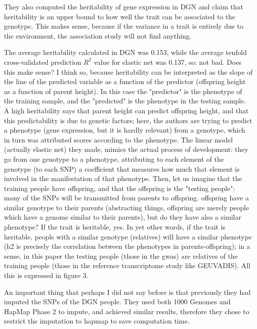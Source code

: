 \documentclass[../main.tex]{subfiles}
\begin{document}

They also computed the heritability of gene expression in DGN and claim 
that heritability is an upper bound to how well the trait can be 
associated to the genotype. This makes sense, because if the variance in 
a trait is entirely due to the environment, the association study will 
not find anything.

The average heritability calculated in DGN was 0.153, while the average 
tenfold cross-validated prediction $R^2$ value for elastic net was 
0.137, so: not bad. Does this make sense? I think so, because 
  heritability can be interpreted as the slope of the line of the 
predicted variable as a function of the predictor (\eg offspring height 
as a function of parent height). In this case the "predictor" is the 
phenotype of the training sample, and the "predicted" is the phenotype 
in the testing sample. A high heritability says that parent height can 
predict offspring height, and that this predictability is due to genetic 
factors; here, the authors are trying to predict a phenotype (gene 
expression, but it is hardly relevant) from a genotype, which in turn 
was attributed scores according to the phenotype. The linear model 
(actually elastic net) they made, mimics the actual process of 
development: they go from one genotype to a phenotype, attributing to 
each element of the genotype (\ie to each SNP) a coefficient that 
measures how much that element is involved in the manifestation of that 
phenotype. Then, let us imagine that the training people have offspring, 
and that the offspring is the "testing people": many of the SNPs will be 
transmitted from parents to offspring. offspring have a similar genotype 
to their parents (abstracting things, offspring are merely people which 
have a genome similar to their parents), but do they have also a similar 
phenotype? If the trait is heritable, yes. In yet other words, if the 
trait is heritable, people with a similar genotype (\ie relatives) will 
have a similar phenotype (h2 is precisely the correlation between the 
phenotypes in parents-offspring); in a sense, in this paper the testing 
people (those in the gwas) are relatives of the training people (those 
in the reference transcriptome study like GEUVADIS). All this is 
expressed in figure 3.

An important thing that perhaps I did not say before is that previously 
they had imputed the SNPs of the DGN people. They used both 1000 Genomes 
and HapMap Phase 2 to impute, and achieved similar results, therefore 
they chose to restrict the imputation to hapmap to save computation 
time.
\end{document}
